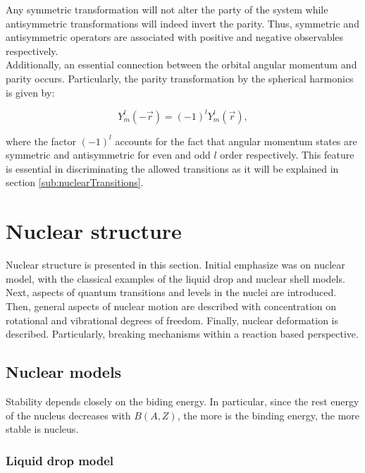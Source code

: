 \documentclass[openany]{book}
\begin{document}
Any symmetric transformation will not alter the party of the system while antisymmetric transformations will indeed invert the parity. Thus, symmetric and antisymmetric operators are associated with positive and negative observables respectively.  \\

Additionally, an essential connection between the orbital angular momentum and parity occurs. Particularly, the parity transformation by the spherical harmonics is given by:

\begin{equation} \label{eq:parity_sphericalHarmonics}
	Y^{l}_{m}(-\vec r) = (-1)^{l}Y^{l}_{m}(\vec r),
\end{equation}

where the factor $(-1)^{l}$ accounts for the fact that angular momentum states are symmetric and antisymmetric for even and odd $l$ order respectively. This feature is essential in discriminating the allowed transitions as it will be explained in section \ref{sub:nuclearTransitions}. 


\section{Nuclear structure} \label{sec:nuclearStructure}

Nuclear structure is presented in this section. Initial emphasize was  on nuclear model, with the classical examples of the liquid drop and nuclear shell models. Next, aspects of quantum transitions and levels in the nuclei are introduced. Then, general aspects of nuclear motion are described with concentration on rotational and vibrational degrees of freedom. Finally, nuclear deformation is described. Particularly, breaking mechanisms within a reaction based perspective. 

\subsection{Nuclear models}  \label{sub:nuclearModels}

Stability depends closely on the biding energy. In particular, since the rest energy of the nucleus decreases with $B(A, Z)$, the more is the binding energy, the more stable is nucleus.

\subsubsection{Liquid drop model} \label{ssub:liquidDropModel}
\end{document}
